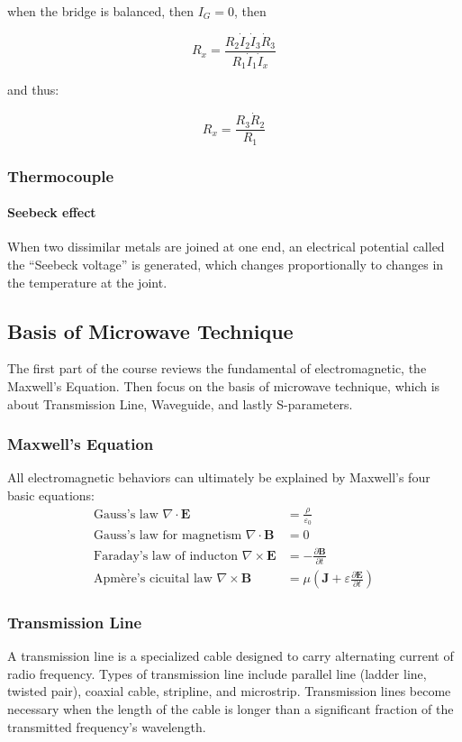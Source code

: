 when the bridge is balanced, then $I_G=0$, then

$$
R_x=\frac{R_2\dot I_2\dot I_3\dot R_3}{R_1\dot I_1\dot I_x}
$$

and thus:

$$R_x=\frac{R_3 \dot R_2}{R_1}$$

\subsubsection{Thermocouple}

\paragraph{Seebeck effect} When two dissimilar metals are joined at one end, an electrical potential
called the ``Seebeck voltage'' is generated, which changes proportionally to changes in the temperature at the joint.

\subsection{Basis of Microwave Technique}
The first part of the course reviews the fundamental of electromagnetic, the Maxwell's Equation. Then focus on the basis of microwave technique, which is about Transmission Line, Waveguide, and lastly S-parameters.
\subsubsection{Maxwell's Equation}

All electromagnetic behaviors can ultimately be explained by Maxwell’s four basic equations:
\begin{align*}
  \mbox{Gauss's law   } \nabla \cdot \mathbf{E} &= \frac{\rho}{\varepsilon_0} \\
  \mbox{Gauss's law for magnetism   } \nabla \cdot \mathbf{B} &= 0 \\
  \mbox{Faraday's law of inducton   } \nabla \times \mathbf{E} &= - \frac{\partial \mathbf{B}}{\partial t} \\
  \mbox{Apm\`ere's cicuital law   } \nabla \times \mathbf{B} &= \mu(\mathbf{J}+\varepsilon\frac{\partial \mathbf{E}}{\partial t})
\end{align*}
\subsubsection{Transmission Line}
A transmission line is a specialized cable designed to carry alternating current of radio frequency.
Types of transmission line include parallel line (ladder line, twisted pair), coaxial cable, stripline, and microstrip. Transmission lines become necessary when the length of the cable is longer than a significant fraction of the transmitted frequency's wavelength.

